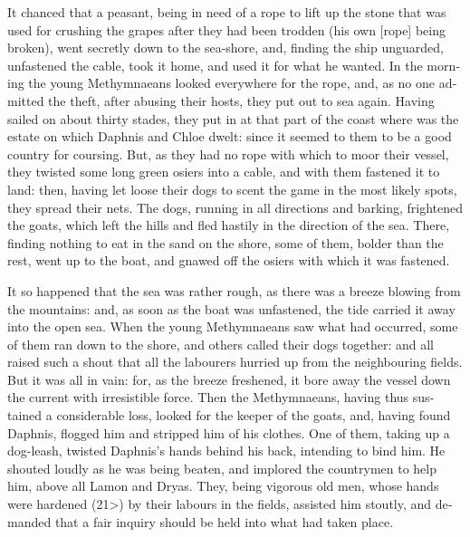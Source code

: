 \documentclass{book}
\begin{document}
\begin{pairs}
\begin{Rightside}
\begin{english}
  It chanced that a peasant, being in need of a rope to lift up the stone that was used for crushing the grapes after they had been trodden (his own [rope] being broken), went secretly down to the sea-shore, and, finding the ship unguarded, unfastened the cable, took it home, and used it for what he wanted.  In the morning the young Methymnaeans looked everywhere for the rope, and, as no one admitted the theft, after abusing their hosts, they put out to sea again.  Having sailed on about thirty stades, they put in at that part of the coast where was the estate on which Daphnis and Chloe dwelt: since it seemed to them to be a good country for coursing.  But, as they had no rope with which to moor their vessel, they twisted some long green osiers into a cable, and with them fastened it to land: then, having let loose their dogs to scent the game in the most likely spots, they spread their nets.  The dogs, running in all directions and barking, frightened the goats, which left the hills and fled hastily in the direction of the sea.  There, finding nothing to eat in the sand on the shore, some of them, bolder than the rest, went up to the boat, and gnawed off the osiers with which it was fastened.
\pend


  It so happened that the sea was rather rough, as there was a breeze blowing from the mountains: and, as soon as the boat was unfastened, the tide carried it away into the open sea.  When the young Methymnaeans saw what had occurred, some of them ran down to the shore, and others called their dogs together: and all raised such a shout that all the labourers hurried up from the neighbouring fields.  But it was all in vain: for, as the breeze freshened, it bore away the vessel down the current with irresistible force.  Then the Methymnaeans, having thus sustained a considerable loss, looked for the keeper of the goats, and, having found Daphnis, flogged him and stripped him of his clothes.  One of them, taking up a dog-leash, twisted Daphnis's hands behind his back, intending to bind him.  He shouted loudly as he was being beaten, and implored the countrymen to help him, above all Lamon and Dryas.  They, being vigorous old men, whose hands were hardened (21>) by their labours in the fields, assisted him stoutly, and demanded that a fair inquiry should be held into what had taken place.
\pend



\end{english}
\end{Rightside}
\end{pairs}
\end{document}
